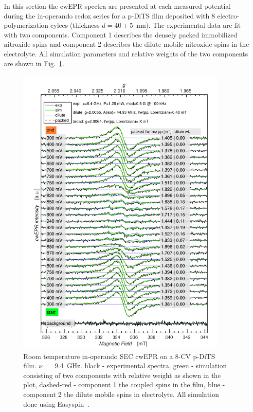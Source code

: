 In this section the cwEPR spectra are presented at each measured potential during the in-operando redox series for a p-DiTS film deposited with 8 electro-polymerization cylces (thickness $d= 40 \pm 5$~nm). The experimental data are fit with two components. Component 1 describes the densely packed immobilized nitroxide spins and component 2 describes the dilute mobile nitroxide spins in the electrolyte. All simulation parameters and relative weights of the two components are shown in Fig.~\ref{fig:S4}.\\

\newpage
\begin{figure}[H]
\centering
\includegraphics[width=0.94\textwidth]{./operando_epr/figures/Figure_S4}
\caption{Room temperature in-operando SEC cwEPR on a 8-CV p-DiTS film. $\nu=$~9.4~GHz. black - experimental spectra, green - simulation consisting of two components with relative weight as shown in the plot, dashed-red - component 1 the coupled spins in the film, blue - component 2 the dilute mobile spins in electrolyte. All simulation done using Easyspin~\cite{Stoll2006}.}
\label{fig:S4}
\end{figure}

